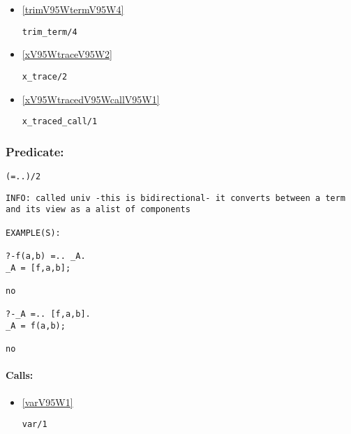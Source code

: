 \begin{itemize}
\item \ref{trimV95WtermV95W4} 
\begin{verbatim}
trim_term/4
\end{verbatim}

\item \ref{xV95WtraceV95W2} 
\begin{verbatim}
x_trace/2
\end{verbatim}

\item \ref{xV95WtracedV95WcallV95W1} 
\begin{verbatim}
x_traced_call/1
\end{verbatim}

\end{itemize}

\subsubsection{Predicate:} \label{V61WV46WV46WV95W2}

\begin{verbatim}
(=..)/2
\end{verbatim}

{\small \begin{verbatim}
INFO: called univ -this is bidirectional- it converts between a term and its view as a alist of components

EXAMPLE(S):

?-f(a,b) =.. _A.
_A = [f,a,b];

no

?-_A =.. [f,a,b].
_A = f(a,b);

no

\end{verbatim}}
\paragraph{Calls:} 
\begin{itemize}
\item \ref{varV95W1} 
\begin{verbatim}
var/1
\end{verbatim}

\end{itemize}
